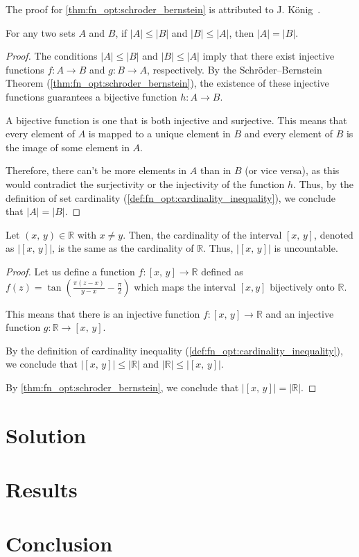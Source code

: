     The proof for \vref{thm:fn_opt:schroder_bernstein} is attributed to J.
    König~\autocite{konigTheorieEnsembles1906}.

    \begin{corollary}
    \label{cor:fn_opt:cardinality}
      For any two sets \(A\) and \(B\), if \(|A| \leq |B|\) and \(|B| \leq 
      |A|\), then \(|A| = |B|\).
    \end{corollary}

    \begin{proof}
      The conditions \(|A| \leq |B|\) and \(|B| \leq |A|\) imply that there
      exist injective functions \(f: A \rightarrow B\) and \(g: B
      \rightarrow A\), respectively.
      By the Schröder--Bernstein Theorem (\vref{thm:fn_opt:schroder_bernstein}),
      the existence of these injective functions guarantees a bijective function
      \(h: A \rightarrow B\).

      A bijective function is one that is both injective and surjective.
      This means that every element of \(A\) is mapped to a unique element in
      \(B\) and every element of \(B\) is the image of some element in \(A\).

      Therefore, there can't be more elements in \(A\) than in \(B\) (or vice
      versa), as this would contradict the surjectivity or the injectivity of
      the function \(h\).
      Thus, by the definition of set cardinality
      (\vref{def:fn_opt:cardinality_inequality}), we conclude that \(|A| =
      |B|\).
    \end{proof}

    \begin{theorem}
    \label{thm:fn_opt:cardinality}
      Let $(x,\,y) \in \mathbb{R}$ with $x \neq y$.
      Then, the cardinality of the interval $[x,\,y]$, denoted as $|[x,\,y]|$,
      is the same as the cardinality of \(\mathbb{R}\).
      Thus, $|[x,\,y]|$ is uncountable.
    \end{theorem}

    \begin{proof}
      Let us define a function \(f: [x,\,y] \rightarrow \mathbb{R}\) defined 
      as \(f(z) = \tan\left(\frac{\pi(z-x)}{y-x} - \frac{\pi}{2}\right)\) 
      which maps the interval \([x, y]\) bijectively onto \(\mathbb{R}\).
      
      This means that there is an injective function \(f: [x,\,y] \rightarrow
      \mathbb{R}\) and an injective function \(g: \mathbb{R} \rightarrow
      [x,\,y]\).

      By the definition of cardinality inequality
      (\vref{def:fn_opt:cardinality_inequality}), we conclude that
      \(|[x,\,y]| \leq |\mathbb{R}|\) and \(|\mathbb{R}| \leq |[x,\,y]|\).

      By \vref{thm:fn_opt:schroder_bernstein}, we conclude that
      \(|[x,\,y]| = |\mathbb{R}|\).
    \end{proof}    

  \section{Solution}
  \label{sec:fn_opt:sol}
    \Blindtext
  \section{Results}
  \label{sec:fn_opt:results}
    \Blindtext
  \section{Conclusion}
  \label{sec:fn_opt:conclusion}
    \Blindtext

